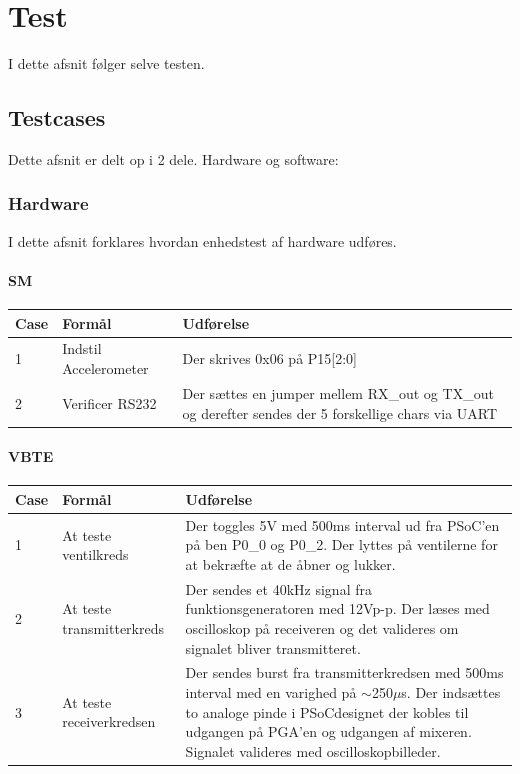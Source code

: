 \chapter{Test}
I dette afsnit følger selve testen.
\section{Testcases}
Dette afsnit er delt op i  2 dele. Hardware og software:\\
\subsection{Hardware}
I dette afsnit forklares hvordan enhedstest af hardware udføres.
\subsubsection{SM}
\begin{table}[H]
\centering
\begin{tabular}{| p{1cm}  | p{4.5cm} | p{8cm} |}
\hline
Case &Formål &Udførelse\\\hline
1 &Indstil Accelerometer &Der skrives 0x06 på P15[2:0]\\\hline
2 &Verificer RS232 &Der sættes en jumper mellem RX\_out og TX\_out og derefter sendes der 5 forskellige chars via UART\\\hline
\end{tabular}
\end{table}
\subsubsection{VBTE}
\begin{table}[H]
\centering
\begin{tabular}{| p{1cm}  | p{4.5cm} | p{8cm} |}
\hline
Case &Formål &Udførelse\\\hline
1 &At teste ventilkreds &Der toggles 5V med 500ms interval ud fra PSoC'en på ben P0\_0 og P0\_2. Der lyttes på ventilerne for at bekræfte at de åbner og lukker.\\\hline
2 &At teste transmitterkreds &Der sendes et 40kHz signal fra funktionsgeneratoren med 12Vp-p. Der læses med oscilloskop på receiveren og det valideres om signalet bliver transmitteret.\\\hline
3 &At teste receiverkredsen & Der sendes burst fra transmitterkredsen med 500ms interval med en varighed på $\sim$250$\mu$s. Der indsættes to analoge pinde i PSoCdesignet der kobles til udgangen på PGA'en og udgangen af mixeren. Signalet valideres med oscilloskopbilleder.\\\hline
\end{tabular}
\end{table}
